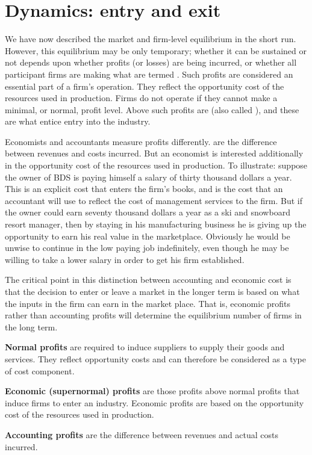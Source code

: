 \section{Dynamics: entry and exit}\label{sec:ch9sec4}

We have now described the market and firm-level equilibrium in the short run. However, this equilibrium may be only temporary; whether it can be sustained or not depends upon whether profits (or losses) are being incurred, or whether all participant firms are making what are termed . Such profits are considered an essential part of a firm's operation. They reflect the opportunity cost of the resources used in production. Firms do not operate if they cannot make a minimal, or normal, profit level. Above such profits are  (also called ), and these are what entice entry into the industry. 

Economists and accountants measure profits differently.  are the difference between revenues and costs incurred. But an economist is interested additionally in the opportunity cost of the resources used in production. To illustrate: suppose the owner of BDS is paying himself a salary of thirty thousand dollars a year. This is an explicit cost that enters the firm's books, and is the cost that an accountant will use to reflect the cost of management services to the firm. But if the owner could earn seventy thousand dollars a year as a ski and snowboard resort manager, then by staying in his manufacturing business he is giving up the opportunity to earn his real value in the marketplace. Obviously he would be unwise to continue in the low paying job indefinitely, even though he may be willing to take a lower salary in order to get his firm established. 

The critical point in this distinction between accounting and economic cost is that the decision to enter or leave a market in the longer term is based on what the inputs in the firm can earn in the market place. That is, economic profits rather than accounting profits will determine the equilibrium number of firms in the long term.

\begin{DefBox}
\textbf{Normal profits} are required to induce suppliers to supply their goods and services. They reflect opportunity costs and can therefore be considered as a type of cost component.

\textbf{Economic (supernormal) profits} are those profits above normal profits that induce firms to enter an industry. Economic profits are based on the opportunity cost of the resources used in production. 

\textbf{Accounting profits} are the difference between revenues and actual costs incurred.
\end{DefBox}

